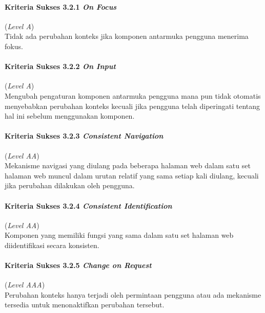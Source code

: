 \paragraph{Kriteria Sukses 3.2.1 \textit{On Focus}}
\label{subsec:kriteria_3.2.1}
(\textit{Level A}) \\

Tidak ada perubahan konteks jika komponen antarmuka pengguna menerima fokus.

\paragraph{Kriteria Sukses 3.2.2 \textit{On Input}}
\label{subsec:kriteria_3.2.2}
(\textit{Level A}) \\

Mengubah pengaturan komponen antarmuka pengguna mana pun tidak otomatis menyebabkan perubahan konteks kecuali jika pengguna telah diperingati tentang hal ini sebelum menggunakan komponen.

\paragraph{Kriteria Sukses 3.2.3 \textit{Consistent Navigation}}
\label{subsec:kriteria_3.2.3}
(\textit{Level AA}) \\

Mekanisme navigasi yang diulang pada beberapa halaman web dalam satu set halaman web muncul dalam urutan relatif yang sama setiap kali diulang, kecuali jika perubahan dilakukan oleh pengguna.

\paragraph{Kriteria Sukses 3.2.4 \textit{Consistent Identification}}
\label{subsec:kriteria_3.2.4}
(\textit{Level AA}) \\

Komponen yang memiliki fungsi yang sama dalam satu set halaman web diidentifikasi secara konsisten.

\paragraph{Kriteria Sukses 3.2.5 \textit{Change on Request}}
\label{subsec:kriteria_3.2.5}
(\textit{Level AAA}) \\

Perubahan konteks hanya terjadi oleh permintaan pengguna atau ada mekanisme tersedia untuk menonaktifkan perubahan tersebut.

